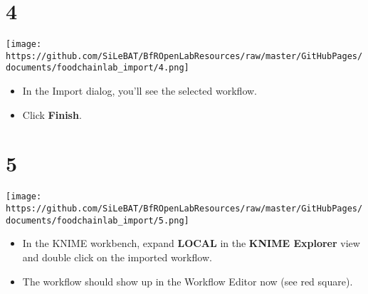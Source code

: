 \documentclass[10pt]{beamer}
\begin{document}
\section{4}
\begin{frame}
	\begin{center}
  		\texttt{[image: https://github.com/SiLeBAT/BfROpenLabResources/raw/master/GitHubPages/documents/foodchainlab\_import/4.png]}
	\end{center}
	\begin{itemize}
		\item In the Import dialog, you'll see the selected workflow.
		\item Click \textbf{Finish}.
	\end{itemize}
\end{frame}

\section{5}
\begin{frame}
	\begin{center}
  		\texttt{[image: https://github.com/SiLeBAT/BfROpenLabResources/raw/master/GitHubPages/documents/foodchainlab\_import/5.png]}
	\end{center}
	\begin{itemize}
		\item In the KNIME workbench, expand \textbf{LOCAL} in the \textbf{KNIME Explorer} view and double click on the imported workflow.
		\item The workflow should show up in the Workflow Editor now (see red square).
	\end{itemize}
\end{frame}
\end{document}
